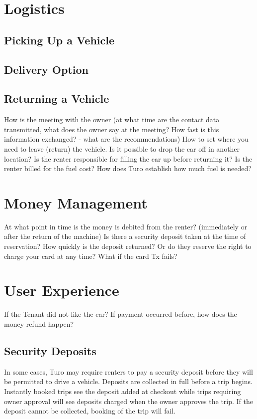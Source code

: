 \documentclass[review,12pt]{elsarticle}
\begin{document}
\section{Logistics}
  \subsection{Picking Up a Vehicle}
  \subsection{Delivery Option}
  \subsection{Returning a Vehicle}
How is the meeting with the owner (at what time are the contact data transmitted, what does the owner say at the meeting? How fast is this information exchanged? - what are the recommendations)
How to set where you need to leave (return) the vehicle. Is it possible to drop the car off in another location?
Is the renter responsible for filling the car up before returning it? Is the renter billed for the fuel cost? How does Turo establish how much fuel is needed?

\section{Money Management}
At what point in time is the money is debited from the renter? (immediately or after the return of the machine)
Is there a security deposit taken at the time of reservation? How quickly is the deposit returned? Or do they reserve the right to charge your card at any time? What if the card Tx fails?

\section{User Experience}

If the Tenant did not like the car? If payment occurred before, how does the money refund happen?

\subsection{Security Deposits}
In some cases, Turo may require renters to pay a security deposit before they will be permitted to drive a vehicle. Deposits are collected in full before a trip begins. Instantly booked trips see the deposit added at checkout while trips requiring owner approval will see deposits charged when the owner approves the trip. If the deposit cannot be collected, booking of the trip will fail.
\end{document}
